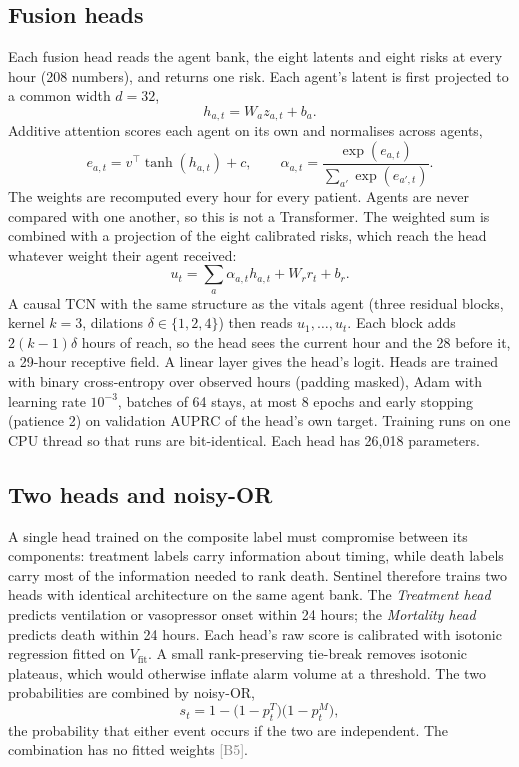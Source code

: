 \documentclass[11pt]{article}
\newcommand{\ev}[1]{\textcolor{gray}{\scriptsize[#1]}}   %
\begin{document}
\subsection{Fusion heads}\label{sec:heads}
Each fusion head reads the agent bank, the eight latents and eight risks at
every hour (208 numbers), and returns one risk. Each agent's latent is first
projected to a common width $d = 32$,
\begin{equation}
  h_{a,t} = W_a z_{a,t} + b_a .
\end{equation}
Additive attention \cite{bahdanau2015attention} scores each agent on
its own and normalises across agents,
\begin{equation}
  e_{a,t} = v^{\top} \tanh(h_{a,t}) + c, \qquad
  \alpha_{a,t} = \frac{\exp(e_{a,t})}{\sum_{a'} \exp(e_{a',t})} .
\end{equation}
The weights are recomputed every hour for every patient. Agents are never
compared with one another, so this is not a Transformer. The weighted sum is
combined with a projection of the eight calibrated risks, which reach the
head whatever weight their agent received:
\begin{equation}
  u_t = \sum_{a} \alpha_{a,t} h_{a,t} + W_r r_t + b_r .
\end{equation}
A causal TCN with the same structure as the vitals agent (three residual
blocks, kernel $k=3$, dilations $\delta \in \{1, 2, 4\}$) then reads $u_1, \ldots, u_t$.
Each block adds $2(k-1)\delta$ hours of reach, so the head sees the current hour and
the 28 before it, a 29-hour receptive field. A linear layer gives the head's
logit. Heads are trained with binary cross-entropy over observed hours (padding
masked), Adam with learning rate $10^{-3}$, batches of 64 stays, at most 8
epochs and early stopping (patience 2) on validation AUPRC of the head's own
target. Training runs on one CPU thread so that runs are bit-identical. Each
head has 26{,}018 parameters.

\subsection{Two heads and noisy-OR}
A single head trained on the composite label must compromise between its
components: treatment labels carry information about timing, while death
labels carry most of the information needed to rank death. Sentinel therefore
trains two heads with identical architecture on the same agent bank. The
\emph{Treatment head} predicts ventilation or vasopressor onset within 24
hours; the \emph{Mortality head} predicts death within 24 hours. Each head's
raw score is calibrated with isotonic regression fitted on $V_{\text{fit}}$.
A small rank-preserving tie-break removes isotonic plateaus, which would
otherwise inflate alarm volume at a threshold. The two probabilities are
combined by noisy-OR,
\begin{equation}
  s_t = 1 - \bigl(1 - p^{T}_t\bigr)\bigl(1 - p^{M}_t\bigr),
\end{equation}
the probability that either event occurs if the two are independent. The
combination has no fitted weights \ev{B5}.
\end{document}
